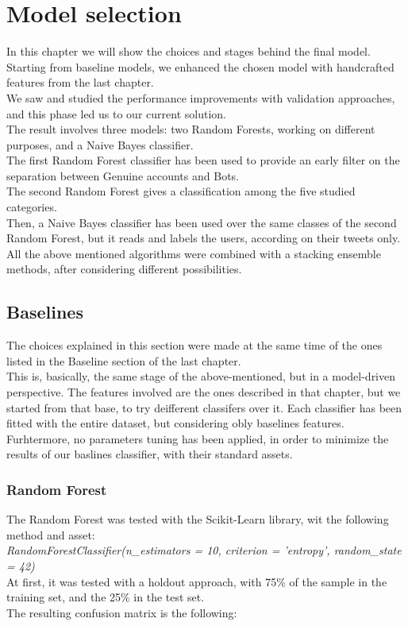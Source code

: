 \chapter{Model selection}
\label{capitolo5}
\thispagestyle{empty}

In this chapter we will show the choices and stages behind the final model.
Starting from baseline models, we enhanced the chosen model with handcrafted features from the last chapter.\\
We saw and studied the performance improvements with validation approaches, and this phase led us to our current solution.\\
The result involves three models: two Random Forests, working on different purposes, and a Naive Bayes classifier.\\
The first Random Forest classifier has been used to provide an early filter on the separation between Genuine accounts and Bots.\\
The second Random Forest gives a classification among the five studied categories.\\
Then, a Naive Bayes classifier has been used over the same classes of the second Random Forest, but it reads and labels the users, according on their tweets only.\\
All the above mentioned algorithms were combined with a stacking ensemble methods, after considering different possibilities.

\section{Baselines}
The choices explained in this section were made at the same time of the ones listed in the Baseline section of the last chapter.\\
This is, basically, the same stage of the above-mentioned, but in a model-driven perspective.
The features involved are the ones described in that chapter, but we started from that base, to try deifferent classifers over it.
Each classifier has been fitted with the entire dataset, but considering obly baselines features.
Furhtermore, no parameters tuning has been applied, in order to minimize the results of our baslines classifier, with their standard assets.
\subsection{Random Forest}
The Random Forest was tested with the Scikit-Learn library, wit the following method and asset:\\
\textit{RandomForestClassifier(n\_estimators = 10, criterion = 'entropy', random\_state = 42)}\\
At first, it was tested with a holdout approach, with 75\% of the sample in the training set, and the 25\% in the test set.\\
The resulting confusion matrix is the following:\\

